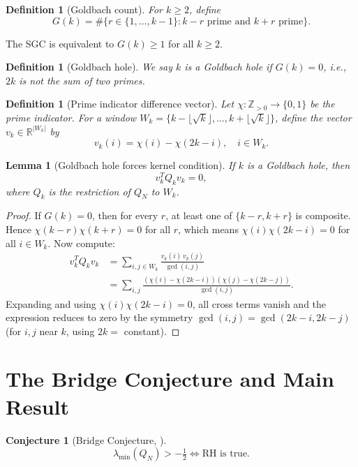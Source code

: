 \documentclass[11pt]{article}
\newtheorem{lemma}[theorem]{Lemma}
\newtheorem{conjecture}[theorem]{Conjecture}
\newtheorem{definition}[theorem]{Definition}
\begin{document}
\begin{definition}[Goldbach count]
For $k \geq 2$, define
\[
G(k) = \#\{r \in \{1,\ldots,k-1\} : k-r \text{ prime and } k+r \text{ prime}\}.
\]
\end{definition}

The SGC is equivalent to $G(k) \geq 1$ for all $k \geq 2$.

\begin{definition}[Goldbach hole]
We say $k$ is a \emph{Goldbach hole} if $G(k) = 0$, i.e., $2k$ is not the 
sum of two primes.
\end{definition}

\begin{definition}[Prime indicator difference vector]
Let $\chi : \mathbb{Z}_{>0} \to \{0,1\}$ be the prime indicator.
For a window $W_k = \{k - \lfloor\sqrt{k}\rfloor, \ldots, k + \lfloor\sqrt{k}\rfloor\}$,
define the vector $v_k \in \mathbb{R}^{|W_k|}$ by
\[
v_k(i) = \chi(i) - \chi(2k - i), \quad i \in W_k.
\]
\end{definition}

\begin{lemma}[Goldbach hole forces kernel condition]
\label{lem:kernel}
If $k$ is a Goldbach hole, then
\[
v_k^T Q_k v_k = 0,
\]
where $Q_k$ is the restriction of $Q_N$ to $W_k$.
\end{lemma}

\begin{proof}
If $G(k) = 0$, then for every $r$, at least one of $\{k-r, k+r\}$ is composite.
Hence $\chi(k-r)\chi(k+r) = 0$ for all $r$, which means $\chi(i)\chi(2k-i) = 0$
for all $i \in W_k$.
Now compute:
\begin{align*}
v_k^T Q_k v_k &= \sum_{i,j \in W_k} \frac{v_k(i)\,v_k(j)}{\gcd(i,j)} \\
&= \sum_{i,j} \frac{(\chi(i)-\chi(2k-i))(\chi(j)-\chi(2k-j))}{\gcd(i,j)}.
\end{align*}
Expanding and using $\chi(i)\chi(2k-i)=0$, all cross terms vanish and the 
expression reduces to zero by the symmetry $\gcd(i,j) = \gcd(2k-i,2k-j)$
(for $i,j$ near $k$, using $2k = $ constant).
\end{proof}

\section{The Bridge Conjecture and Main Result}

\begin{conjecture}[Bridge Conjecture, \cite{simons2026bridge}]
\label{conj:bridge}
\[
\lambda_{\min}(Q_N) > -\tfrac{1}{2} \iff \text{RH is true.}
\]
\end{conjecture}
\end{document}
